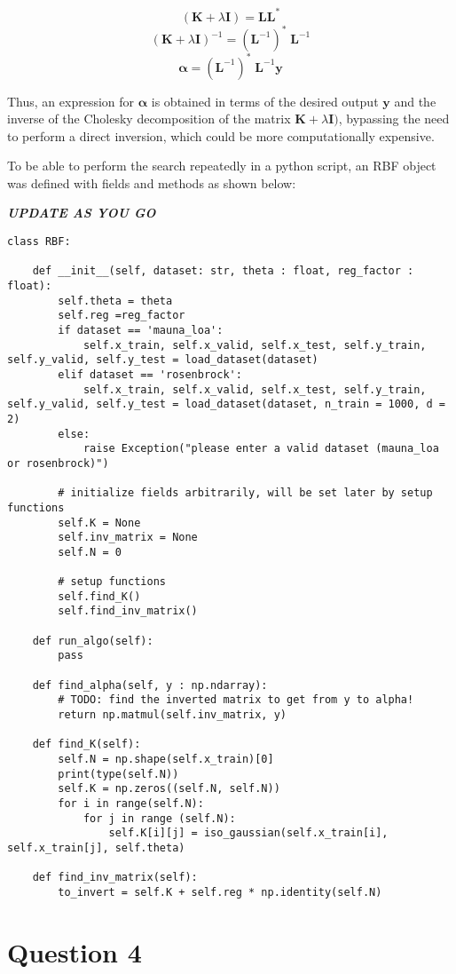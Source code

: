 \documentclass{article}
\begin{document}
\begin{equation}
(\mathbf{K} + \lambda \mathbf{I}) = \mathbf{L} \mathbf{L}^*
\end{equation}
\begin{equation}
(\mathbf{K} + \lambda \mathbf{I})^{-1} = (\mathbf{L}^{-1})^* \;\mathbf{L}^{-1}
\end{equation}
\begin{equation}
\boldsymbol\alpha = (\mathbf{L}^{-1})^* \;\mathbf{L}^{-1} \mathbf{y}
\end{equation}

Thus, an expression for $\boldsymbol\alpha$ is obtained in terms of the desired output $\mathbf{y}$ and the inverse of the Cholesky decomposition of the matrix $\mathbf{K} + \lambda \mathbf{I})$, bypassing the need to perform a direct inversion, which could be more computationally expensive.

To be able to perform the search repeatedly in a python script, an RBF object was defined with fields and methods as shown below:

\textit{\textbf{UPDATE AS YOU GO}}
\begin{lstlisting}
class RBF:

    def __init__(self, dataset: str, theta : float, reg_factor : float):
        self.theta = theta
        self.reg =reg_factor
        if dataset == 'mauna_loa':
            self.x_train, self.x_valid, self.x_test, self.y_train, self.y_valid, self.y_test = load_dataset(dataset)
        elif dataset == 'rosenbrock':
            self.x_train, self.x_valid, self.x_test, self.y_train, self.y_valid, self.y_test = load_dataset(dataset, n_train = 1000, d = 2)
        else:
            raise Exception("please enter a valid dataset (mauna_loa or rosenbrock)")
        
        # initialize fields arbitrarily, will be set later by setup functions
        self.K = None
        self.inv_matrix = None
        self.N = 0

        # setup functions
        self.find_K()
        self.find_inv_matrix()

    def run_algo(self):
        pass
    
    def find_alpha(self, y : np.ndarray):
        # TODO: find the inverted matrix to get from y to alpha!
        return np.matmul(self.inv_matrix, y)
    
    def find_K(self):
        self.N = np.shape(self.x_train)[0]
        print(type(self.N))
        self.K = np.zeros((self.N, self.N))
        for i in range(self.N):
            for j in range (self.N):
                self.K[i][j] = iso_gaussian(self.x_train[i], self.x_train[j], self.theta)
    
    def find_inv_matrix(self):
        to_invert = self.K + self.reg * np.identity(self.N)
\end{lstlisting}
\section*{Question 4}
\end{document}
